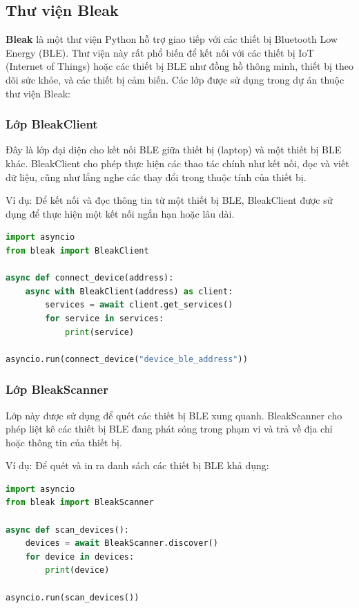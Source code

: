 \subsection{Thư viện Bleak}
\textbf{Bleak} là một thư viện Python hỗ trợ giao tiếp với các thiết bị Bluetooth Low Energy (BLE). Thư viện này rất phổ biến để kết nối với các thiết bị IoT (Internet of Things) hoặc các thiết bị BLE như đồng hồ thông minh, thiết bị theo dõi sức khỏe, và các thiết bị cảm biến. Các lớp được sử dụng trong dự án thuộc thư viện Bleak:

\subsubsection{Lớp BleakClient}
Đây là lớp đại diện cho kết nối BLE giữa thiết bị (laptop) và một thiết bị BLE khác. BleakClient cho phép thực hiện các thao tác chính như kết nối, đọc và viết dữ liệu, cũng như lắng nghe các thay đổi trong thuộc tính của thiết bị.

Ví dụ: Để kết nối và đọc thông tin từ một thiết bị BLE, BleakClient được sử dụng để thực hiện một kết nối ngắn hạn hoặc lâu dài.
\begin{lstlisting}[language=python,caption={Đoạn code mẫu sử dụng lớp BleakClient}]
import asyncio
from bleak import BleakClient

async def connect_device(address):
    async with BleakClient(address) as client:
        services = await client.get_services()
        for service in services:
            print(service)

asyncio.run(connect_device("device_ble_address"))
\end{lstlisting}

\subsubsection{Lớp BleakScanner}
Lớp này được sử dụng để quét các thiết bị BLE xung quanh. BleakScanner cho phép liệt kê các thiết bị BLE đang phát sóng trong phạm vi và trả về địa chỉ hoặc thông tin của thiết bị.

Ví dụ: Để quét và in ra danh sách các thiết bị BLE khả dụng:
\begin{lstlisting}[language=python,caption={Đoạn code mẫu sử dụng lớp BleakScanner}]
import asyncio
from bleak import BleakScanner

async def scan_devices():
    devices = await BleakScanner.discover()
    for device in devices:
        print(device)

asyncio.run(scan_devices())
\end{lstlisting}


